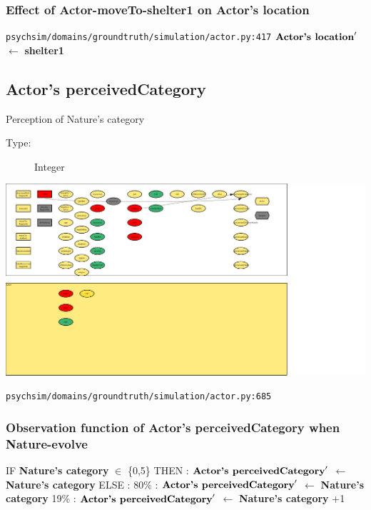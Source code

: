 \documentclass{article}%
\begin{document}
%
\subsubsection{Effect of Actor{-}moveTo{-}shelter1 on Actor's location}%
\label{ssubsec:Effect of Actor{-}moveTo{-}shelter1 on Actor's location}%
\begin{flushleft}%
\verb|psychsim/domains/groundtruth/simulation/actor.py:417|%
\linebreak%
$\mbox{\textbf{Actor's location}} '$%
$\leftarrow$%
\textbf{shelter1}%
\end{flushleft}

%
\subsection{Actor's perceivedCategory}%
\label{subsec:Actor's perceivedCategory}%
Perception of Nature's category%
\begin{description}%
\item[Type:]%
Integer%
\end{description}%
\includegraphics[width=\textwidth]{images/perceivedCategoryOfActor.png}%
\begin{flushleft}%
\verb|psychsim/domains/groundtruth/simulation/actor.py:685|%
\end{flushleft}%
\subsubsection{Observation function of Actor's perceivedCategory when Nature{-}evolve}%
\label{ssubsec:Observation function of Actor's perceivedCategory when Nature{-}evolve}%
\begin{flushleft}%
IF %
\textbf{Nature's category}%
$\in$%
\{0,5\}%
\linebreak%
\hspace*{2em}%
THEN %
: %
$\mbox{\textbf{Actor's perceivedCategory}} '$%
$\leftarrow$%
\textbf{Nature's category}%
\linebreak%
\hspace*{2em}%
ELSE %
: %
\linebreak%
\hspace*{4em}%
80\%%
: %
$\mbox{\textbf{Actor's perceivedCategory}} '$%
$\leftarrow$%
\textbf{Nature's category}%
\linebreak%
\hspace*{4em}%
19\%%
: %
$\mbox{\textbf{Actor's perceivedCategory}} '$%
$\leftarrow$%
\textbf{Nature's category}%
+1%
\end{flushleft}
\end{document}
